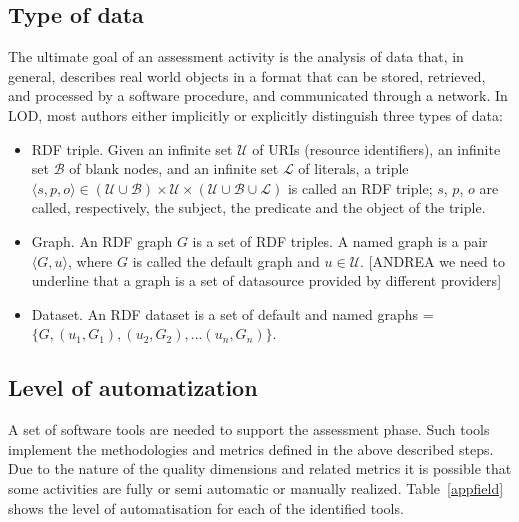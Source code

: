 \subsection{Type of data}
\label{sec:data}
The ultimate goal of an assessment activity is the analysis of data that, in general, describes real world objects in a format that can be stored, retrieved, and processed by a software procedure, and communicated through a network. 
In LOD, most authors either implicitly or explicitly distinguish three types of data:
\begin{itemize}
\item RDF triple. Given an infinite set $\mathcal{U}$ of URIs (resource identifiers), an infinite set $\mathcal{B}$ of blank nodes, and an infinite set $\mathcal{L}$ of literals, a triple $ \langle s, p, o \rangle \in (\mathcal{U} \cup \mathcal{B})\times \mathcal{U} \times (\mathcal{U} \cup \mathcal{B} \cup \mathcal{L})$ is called an RDF triple; $s$, $p$, $o$ are called, respectively, the subject, the predicate and the object of the triple.
\item Graph. An RDF graph $G$ is a set of RDF triples. A named graph is a pair  $\langle G,u \rangle$, where $G$ is called the default graph and $u\in\mathcal{U}$. [ANDREA we need to underline that a graph is a set of datasource provided by different providers]
\item Dataset. An RDF dataset is a set of default and named graphs = $\lbrace G, (u_1,G_1), (u_2,G_2), ...(u_n,G_n)\rbrace$.
\end{itemize}

\subsection{Level of automatization}
\label{sec:auto}
A set of software tools are needed to support the assessment phase. 
Such tools implement the methodologies and metrics defined in the above described steps. 
Due to the nature of the quality dimensions and related metrics it is possible that some activities are fully or semi automatic or manually realized.
Table~\ref{appfield} shows the level of automatisation for each of the identified tools.

